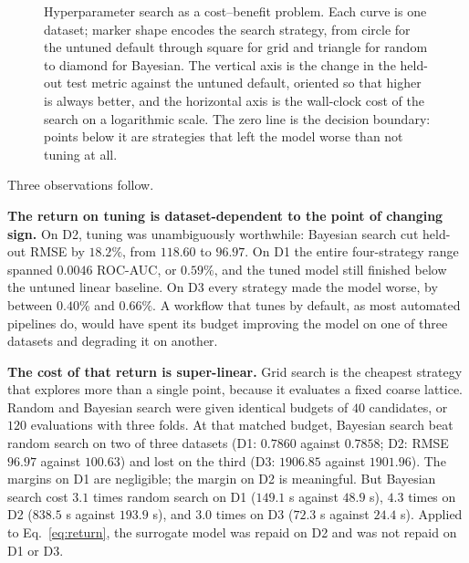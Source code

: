 \documentclass{ieeeaccess}
\begin{document}
\begin{figure}[t]
\caption{Hyperparameter search as a cost--benefit problem. Each curve is one dataset; marker shape encodes the search strategy, from circle for the untuned default through square for grid and triangle for random to diamond for Bayesian. The vertical axis is the change in the held-out test metric against the untuned default, oriented so that higher is always better, and the horizontal axis is the wall-clock cost of the search on a logarithmic scale. The zero line is the decision boundary: points below it are strategies that left the model worse than not tuning at all.}
\label{fig:cost}
\end{figure}

Three observations follow.

\textbf{The return on tuning is dataset-dependent to the point of changing sign.} On D2, tuning was unambiguously worthwhile: Bayesian search cut held-out RMSE by $18.2\%$, from $118.60$ to $96.97$. On D1 the entire four-strategy range spanned $0.0046$ ROC-AUC, or $0.59\%$, and the tuned model still finished below the untuned linear baseline. On D3 every strategy made the model worse, by between $0.40\%$ and $0.66\%$. A workflow that tunes by default, as most automated pipelines do, would have spent its budget improving the model on one of three datasets and degrading it on another.

\textbf{The cost of that return is super-linear.} Grid search is the cheapest strategy that explores more than a single point, because it evaluates a fixed coarse lattice. Random and Bayesian search were given identical budgets of $40$ candidates, or $120$ evaluations with three folds. At that matched budget, Bayesian search beat random search on two of three datasets (D1: $0.7860$ against $0.7858$; D2: RMSE $96.97$ against $100.63$) and lost on the third (D3: $1906.85$ against $1901.96$). The margins on D1 are negligible; the margin on D2 is meaningful. But Bayesian search cost $3.1$ times random search on D1 ($149.1$ s against $48.9$ s), $4.3$ times on D2 ($838.5$ s against $193.9$ s), and $3.0$ times on D3 ($72.3$ s against $24.4$ s). Applied to Eq.~\eqref{eq:return}, the surrogate model was repaid on D2 and was not repaid on D1 or D3.
\end{document}
